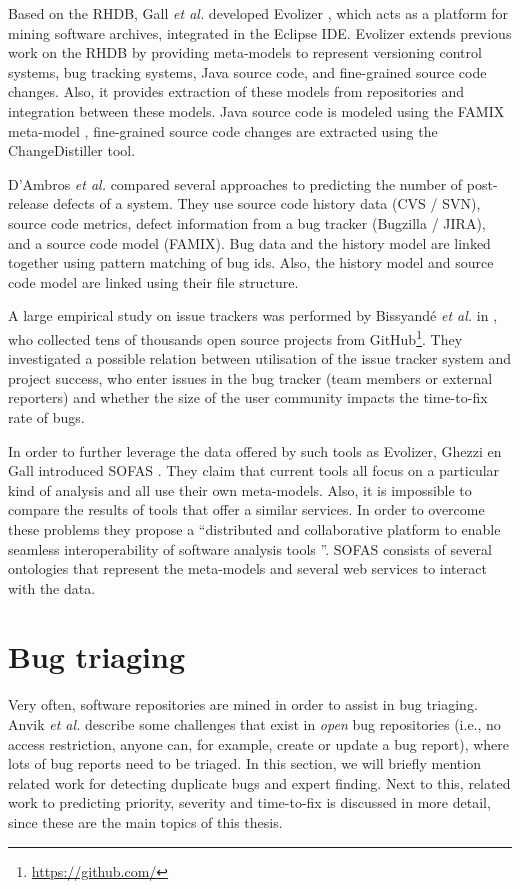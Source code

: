 Based on the RHDB, Gall \emph{et al.} developed Evolizer \cite{Gall2009}, which acts as a platform for mining software archives, integrated in the Eclipse IDE. Evolizer extends previous work on the RHDB by providing meta-models to represent versioning control systems, bug tracking systems, Java source code, and fine-grained source code changes. Also, it provides extraction of these models from repositories and integration between these models. Java source code is modeled using the FAMIX meta-model \cite{Tichelaar2001,Tichelaar2000}, fine-grained source code changes are extracted using the ChangeDistiller tool.

D'Ambros \emph{et al.} \cite{D'Ambros2010} compared several approaches to predicting the number of post-release defects of a system. They use source code history data (CVS / SVN), source code metrics, defect information from a bug tracker (Bugzilla / JIRA), and a source code model (FAMIX). Bug data and the history model are linked together using pattern matching of bug ids. Also, the history model and source code model are linked using their file structure. 

A large empirical study on issue trackers was performed by Bissyand\'{e} \emph{et al.} in \cite{Bissyande2012}, who collected tens of thousands open source projects from GitHub\footnote{\url{https://github.com/}}. They investigated a possible relation between utilisation of the issue tracker system and project success, who enter issues in the bug tracker (team members or external reporters) and whether the size of the user community impacts the time-to-fix rate of bugs.

In order to further leverage the data offered by such tools as Evolizer, Ghezzi en Gall introduced SOFAS \cite{Ghezzi2008,Ghezzi2010,Ghezzi2011}. They claim that current tools all focus on a particular kind of analysis and all use their own meta-models. Also, it is impossible to compare the results of tools that offer a similar services. In order to overcome these problems they propose a ``distributed and collaborative platform to enable seamless interoperability of software analysis tools \cite{Ghezzi2008}''. SOFAS consists of several ontologies that represent the meta-models and several web services to interact with the data. 

\section{Bug triaging}
\label{sec:bug_triaging}
Very often, software repositories are mined in order to assist in bug triaging. Anvik \emph{et al.} \cite{Anvik2005} describe some challenges that exist in \emph{open} bug repositories (i.e., no access restriction, anyone can, for example, create or update a bug report), where lots of bug reports need to be triaged. In this section, we will briefly mention related work for detecting duplicate bugs and expert finding. Next to this, related work to predicting priority, severity and time-to-fix is discussed in more detail, since these are the main topics of this thesis.

